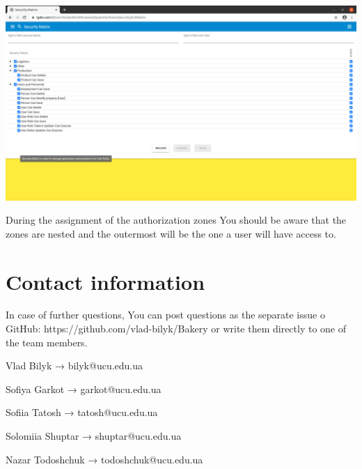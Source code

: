 \includegraphics[width=\textwidth]{sections/01-chapter/images/system155.png}

During the assignment of the authorization zones You should be aware that the zones are nested and the outermost will be the one a user will have access to. 

\section{Contact information}
In case of further questions, You can post questions as the separate issue o GitHub: https://github.com/vlad-bilyk/Bakery or write them directly to one of the team members. 

Vlad Bilyk  →  bilyk@ucu.edu.ua

Sofiya Garkot  →  garkot@ucu.edu.ua

Sofiia Tatosh  →  tatosh@ucu.edu.ua

Solomiia Shuptar  →  shuptar@ucu.edu.ua

Nazar Todoshchuk  →  todoshchuk@ucu.edu.ua
